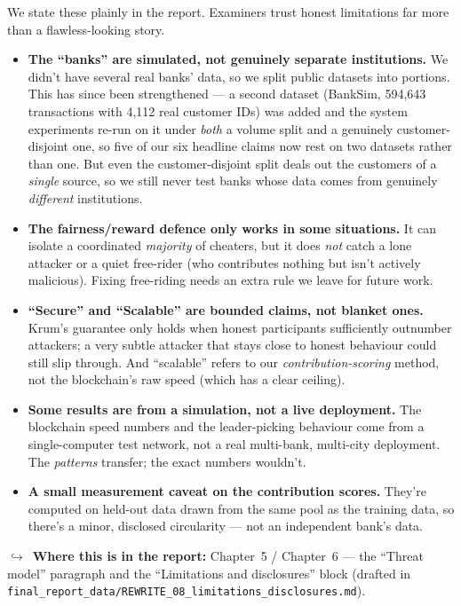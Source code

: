 \documentclass[11pt]{article}
\newcommand{\reportnote}[1]{%
  \par\vspace{3pt}%
  {\small\color{soft}$\hookrightarrow$\ \textbf{Where this is in the report:} #1}\par\vspace{2pt}}
\begin{document}
We state these plainly in the report. Examiners trust honest limitations far more than a flawless-looking
story.

\begin{itemize}
  \item \textbf{The ``banks'' are simulated, not genuinely separate institutions.} We didn't have several
  real banks' data, so we split public datasets into portions. This has since been strengthened --- a
  second dataset (BankSim, 594{,}643 transactions with 4{,}112 real customer IDs) was added and the system
  experiments re-run on it under \emph{both} a volume split and a genuinely customer-disjoint one, so five
  of our six headline claims now rest on two datasets rather than one. But even the customer-disjoint
  split deals out the customers of a \emph{single} source, so we still never test banks whose data comes
  from genuinely \emph{different} institutions.
  \item \textbf{The fairness/reward defence only works in some situations.} It can isolate a coordinated
  \emph{majority} of cheaters, but it does \emph{not} catch a lone attacker or a quiet free-rider (who
  contributes nothing but isn't actively malicious). Fixing free-riding needs an extra rule we leave for
  future work.
  \item \textbf{``Secure'' and ``Scalable'' are bounded claims, not blanket ones.} Krum's guarantee only
  holds when honest participants sufficiently outnumber attackers; a very subtle attacker that stays close
  to honest behaviour could still slip through. And ``scalable'' refers to our \emph{contribution-scoring}
  method, not the blockchain's raw speed (which has a clear ceiling).
  \item \textbf{Some results are from a simulation, not a live deployment.} The blockchain speed numbers
  and the leader-picking behaviour come from a single-computer test network, not a real multi-bank,
  multi-city deployment. The \emph{patterns} transfer; the exact numbers wouldn't.
  \item \textbf{A small measurement caveat on the contribution scores.} They're computed on held-out data
  drawn from the same pool as the training data, so there's a minor, disclosed circularity --- not an
  independent bank's data.
\end{itemize}

\reportnote{Chapter~5 / Chapter~6 --- the ``Threat model'' paragraph and the ``Limitations and
disclosures'' block (drafted in \texttt{final\_report\_data/REWRITE\_08\_limitations\_disclosures.md}).}
\end{document}
